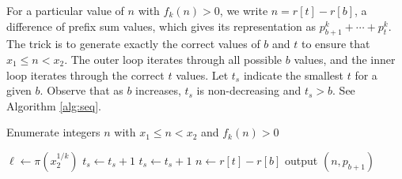 \documentclass[11pt]{amsart}
\numberwithin{equation}{section}
\numberwithin{algorithm}{section}
\begin{document}
For a particular value of $n$ with $f_k(n)>0$,
we write $n=r[t]-r[b]$, a difference of prefix sum values,
which gives its representation as
$p_{b+1}^k+\cdots +p_t^k$.
The trick is to generate exactly the correct values of $b$ and $t$ 
to ensure that $x_1\le n < x_2$.
The outer loop iterates through all possible $b$ values,
  and the inner loop iterates through the correct $t$ values.
Let $t_s$ indicate the smallest $t$ for a given $b$.
Observe that as $b$ increases, $t_s$ is non-decreasing 
and $t_s> b$.  
See Algorithm \ref{alg:seq}.
\begin{algorithm}[ht]
\caption{Enumerate integers $n$ with $x_1\le n<x_2$
  and $f_k(n)>0$}\label{alg:seq}
\begin{algorithmic}
 \State $\ell\gets\pi(x_2^{1/k})$
        \State $t_s\gets t_s+1$
      \EndWhile
       \State $t_s\gets t_s+1$
      \EndWhile
        \State $n\gets r[t]-r[b]$
          \State output $(n,p_{b+1})$
        \EndIf
      \EndFor 
    \EndFor 
\end{algorithmic}
\end{algorithm}
\end{document}
